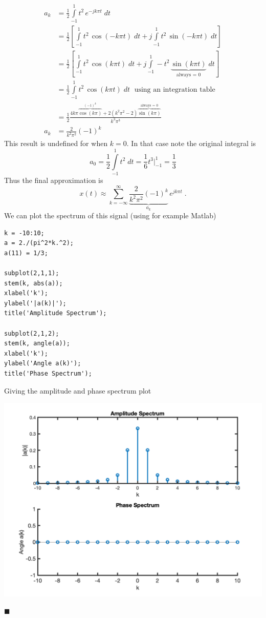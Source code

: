 \begin{example}
\begin{align*}
  a_k &= \frac{1}{2} \int\limits_{-1}^{1} t^2\,e^{-jk\pi t} \; dt\\
  &= \frac{1}{2} \left[ \int\limits_{-1}^{1} t^2\,\cos(-k\pi t) \; dt + j \int\limits_{-1}^{1} t^2\,\sin(-k\pi t) \; dt \right]\\
  &= \frac{1}{2} \left[ \int\limits_{-1}^{1} t^2\,\cos(k\pi t) \; dt + j \int\limits_{-1}^{1} - t^2\,\underbrace{\sin(k\pi t)}_{\text{always = 0}} \; dt \right]\\
  &= \frac{1}{2} \int\limits_{-1}^{1} t^2\,\cos(k\pi t) \; dt\; \mbox{ using an integration table }\\
  &= \frac{1}{2} \frac{4k\pi\overbrace{\cos(k\pi)}^{(-1)^k} + 2(k^2\pi^2-2)\overbrace{\sin(k\pi)}^{\text{always = 0}}}{k^3\pi^3}\\
 a_k &= \frac{2}{k^2\pi^2}\left(-1\right)^k
\end{align*}
This result is undefined for when $k=0$. In that case note the original integral is
\[
a_0 = \frac{1}{2} \int\limits_{-1}^{1} t^2 \; dt = \frac{1}{6}t^3 \Big|_{-1}^{1} = \frac{1}{3} 
\]
Thus the final approximation is
\[
x(t) \approx \sum\limits_{k = -\infty}^{\infty} \underbrace{\frac{2}{k^2\pi^2}\left(-1\right)^k}_{a_k} \, e^{j k\pi t} \;.
\]
We can plot the spectrum of this signal (using for example Matlab)
\begin{verbatim}
k = -10:10;
a = 2./(pi^2*k.^2);
a(11) = 1/3;

subplot(2,1,1);
stem(k, abs(a));
xlabel('k');
ylabel('|a(k)|');
title('Amplitude Spectrum');

subplot(2,1,2);
stem(k, angle(a));
xlabel('k');
ylabel('Angle a(k)');
title('Phase Spectrum');
\end{verbatim}
Giving the amplitude and phase spectrum plot
\begin{center}
\includegraphics[scale=0.7]{graphics/ctfs_exampleplot.png}
\end{center}
$\blacksquare$
\end{example}

